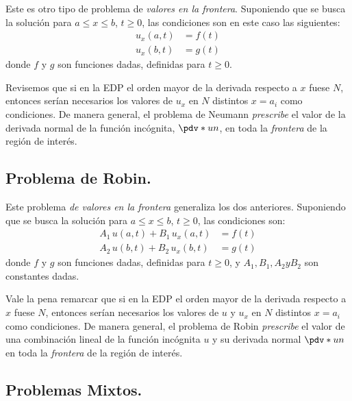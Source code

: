 Este es otro tipo de problema de \emph{valores en la frontera}. Suponiendo que se busca la solución para $a \leq x \leq b$, $t \geq 0$, las condiciones son en este caso las siguientes:
\begin{align}
u_{x}(a, t) &= f(t) \label{eq:ecuacion_Z01_11} \\[0.5em]
u_{x}(b, t) &= g(t) \label{eq:ecuacion_Z01_12}
\end{align}
donde $f$ y $g$ son funciones dadas, definidas para $t \geq 0$.
\par
Revisemos que si en la EDP el orden mayor de la derivada respecto a $x$ fuese $N$, entonces serían necesarios los valores de $u_{x}$ en $N$ distintos $x = a_{i}$ como condiciones. De manera general, el problema de Neumann \emph{prescribe} el valor de la derivada normal de la función incógnita, $\pdv*{u}{n}$, en toda la \emph{frontera} de la región de interés.

\subsection{Problema de Robin.}

Este problema \emph{de valores en la frontera} generaliza los dos anteriores. Suponiendo que se busca la solución para $a \leq x \leq b$, $t \geq 0$, las condiciones son:
\begin{align}
A_{1} \, u(a, t) + B_{1} \, u_{x}(a, t) &= f(t) \label{eq:ecuacion_Z01_13} \\[0.5em]
A_{2} \, u(b, t) + B_{2} \, u_{x}(b, t) &= g(t) \label{eq:ecuacion_Z01_14}
\end{align}
donde $f$ y $g$ son funciones dadas, definidas para $t \geq 0$, y $A_{1}, B_{1}, A_{2} y B_{2}$ son constantes dadas.
\par
Vale la pena remarcar que si en la EDP el orden mayor de la derivada respecto a $x$ fuese $N$, entonces serían necesarios los valores de $u$ y $u_{x}$ en $N$ distintos $x = a_{i}$ como condiciones. De manera general, el problema de Robin \emph{prescribe} el valor de una combinación lineal de la función incógnita $u$ y su derivada normal $\pdv*{u}{n}$ en toda la \emph{frontera} de la región de interés.

\subsection{Problemas Mixtos.}


